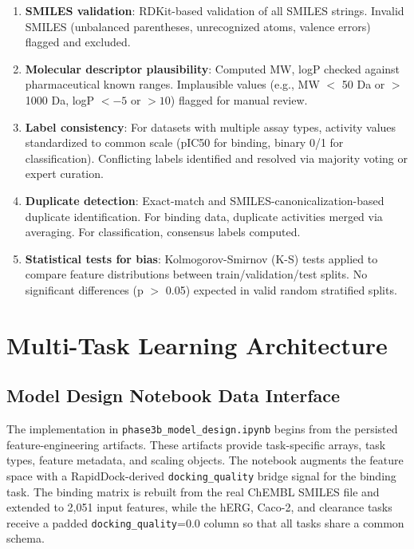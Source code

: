\documentclass[a4paper,11pt,twoside]{report}
\begin{document}
\begin{enumerate}
\item \textbf{SMILES validation}: RDKit-based validation of all SMILES strings. Invalid SMILES (unbalanced parentheses, unrecognized atoms, valence errors) flagged and excluded.

\item \textbf{Molecular descriptor plausibility}: Computed MW, logP checked against pharmaceutical known ranges. Implausible values (e.g., MW $<$ 50 Da or $>$ 1000 Da, logP $<-5$ or $> 10$) flagged for manual review.

\item \textbf{Label consistency}: For datasets with multiple assay types, activity values standardized to common scale (pIC50 for binding, binary 0/1 for classification). Conflicting labels identified and resolved via majority voting or expert curation.

\item \textbf{Duplicate detection}: Exact-match and SMILES-canonicalization-based duplicate identification. For binding data, duplicate activities merged via averaging. For classification, consensus labels computed.

\item \textbf{Statistical tests for bias}: Kolmogorov-Smirnov (K-S) tests applied to compare feature distributions between train/validation/test splits. No significant differences (p $>$ 0.05) expected in valid random stratified splits.
\end{enumerate}

\section{Multi-Task Learning Architecture}

\subsection{Model Design Notebook Data Interface}


The implementation in \texttt{phase3b\_model\_design.ipynb} begins from the persisted feature-engineering artifacts. These artifacts provide task-specific arrays, task types, feature metadata, and scaling objects. The notebook augments the feature space with a RapidDock-derived \texttt{docking\_quality} bridge signal for the binding task. The binding matrix is rebuilt from the real ChEMBL SMILES file and extended to 2,051 input features, while the hERG, Caco-2, and clearance tasks receive a padded \texttt{docking\_quality}=0.0 column so that all tasks share a common schema.
\end{document}
